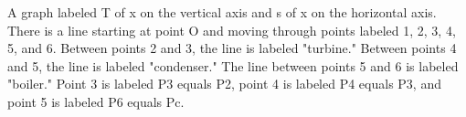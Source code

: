 A graph labeled T of x on the vertical axis and s of x on the horizontal axis. There is a line starting at point O and moving through points labeled 1, 2, 3, 4, 5, and 6. Between points 2 and 3, the line is labeled "turbine." Between points 4 and 5, the line is labeled "condenser." The line between points 5 and 6 is labeled "boiler." Point 3 is labeled P3 equals P2, point 4 is labeled P4 equals P3, and point 5 is labeled P6 equals Pc.
